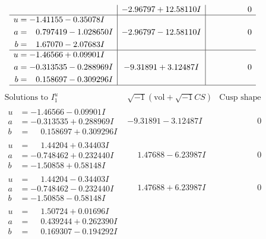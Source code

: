 \documentclass[1p]{elsarticle_modified}
\theoremstyle{definition}
\newcommand{\I}{\sqrt{-1}}
\begin{document}
$$\begin{array}{c|c|c}
 & -2.96797 + 12.58110 I & \phantom{-0.000000 } 0 \\ \hline\begin{aligned}
u &= -1.41155 - 0.35078 I \\
a &= \phantom{-}0.797419 - 1.028650 I \\
b &= \phantom{-}1.67070 - 2.07683 I\end{aligned}
 & -2.96797 - 12.58110 I & \phantom{-0.000000 } 0 \\ \hline\begin{aligned}
u &= -1.46566 + 0.09901 I \\
a &= -0.313535 - 0.288969 I \\
b &= \phantom{-}0.158697 - 0.309296 I\end{aligned}
 & -9.31891 + 3.12487 I & \phantom{-0.000000 } 0\\
 \hline 
 \end{array}$$\newpage$$\begin{array}{c|c|c}  
\text{Solutions to }I^u_{1}& \I (\text{vol} + \sqrt{-1}CS) & \text{Cusp shape}\\
 \hline 
\begin{aligned}
u &= -1.46566 - 0.09901 I \\
a &= -0.313535 + 0.288969 I \\
b &= \phantom{-}0.158697 + 0.309296 I\end{aligned}
 & -9.31891 - 3.12487 I & \phantom{-0.000000 } 0 \\ \hline\begin{aligned}
u &= \phantom{-}1.44204 + 0.34403 I \\
a &= -0.748462 + 0.232440 I \\
b &= -1.50858 + 0.58148 I\end{aligned}
 & \phantom{-}1.47688 - 6.23987 I & \phantom{-0.000000 } 0 \\ \hline\begin{aligned}
u &= \phantom{-}1.44204 - 0.34403 I \\
a &= -0.748462 - 0.232440 I \\
b &= -1.50858 - 0.58148 I\end{aligned}
 & \phantom{-}1.47688 + 6.23987 I & \phantom{-0.000000 } 0 \\ \hline\begin{aligned}
u &= \phantom{-}1.50724 + 0.01696 I \\
a &= \phantom{-}0.439244 + 0.262390 I \\
b &= \phantom{-}0.169307 - 0.194292 I\end{aligned}

\end{array}$$
\end{document}
